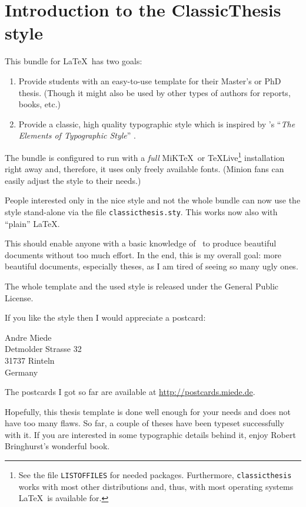 \chapter{Introduction to the ClassicThesis style}\label{ch:introduction}
This bundle for \LaTeX\ has two goals:
\begin{enumerate}
    \item Provide students with an easy-to-use template for their
    Master's
    or PhD thesis. (Though it might also be used by other types of
    authors
    for reports, books, etc.)
    \item Provide a classic, high quality typographic style which is
    inspired by \citeauthor{bringhurst:2002}'s ``\emph{The Elements of
    Typographic Style}'' \citep{bringhurst:2002}.
    \graffito{\myTitle \myVersion}
\end{enumerate}
The bundle is configured to run with a \emph{full} 
MiK\TeX\ or \TeX Live\footnote{See the file \texttt{LISTOFFILES} for
needed packages. Furthermore, \texttt{classicthesis} 
works with most other distributions and, thus, with most operating 
systems \LaTeX\ is available for.} 
installation right away and, therefore, it uses only freely available 
fonts. (Minion fans can easily adjust the style to their needs.)

People interested only in the nice style and not the whole bundle can
now use the style stand-alone via the file \texttt{classicthesis.sty}.
This works now also with ``plain'' \LaTeX.

This should enable anyone with a basic knowledge of \LaTeXe\ to
produce beautiful documents without too much effort. In the end, this
is my overall goal: more beautiful documents, especially theses, as I
am tired of seeing so many ugly ones.

The whole template and the used style is released under the
 General Public License. 

If you like the style then I would appreciate a postcard:
\begin{center}
 Andre Miede \\
 Detmolder Strasse 32 \\
 31737 Rinteln \\
 Germany
\end{center}
The postcards I got so far are available at \url{http://postcards.miede.de}.

Hopefully, this thesis template is done well enough for your needs and
does not have too many flaws. So far, a couple of theses have been
typeset successfully with it. If you are interested in some
typographic details behind it, enjoy Robert Bringhurst's wonderful book.

